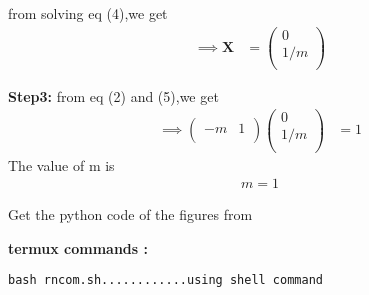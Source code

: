 \documentclass[10pt, a4paper]{article}
\let\vec\mathbf
\begin{document}
from solving eq (4),we get
\begin{align}
\implies\vec{X} &= \begin{pmatrix}0 \\ 1/m \\ \end{pmatrix}
\end{align}

\textbf{Step3:}
from eq (2) and (5),we get
\begin{align}
\implies\begin{pmatrix}-m & 1 \\ \end{pmatrix}\begin{pmatrix}0 \\ 1/m \\ \end{pmatrix} &= 1
\end{align}
The value of m is
\begin{align}
	\boxed{m=1}
\end{align}	

Get the python code of the figures from
\begin{table}[h]
\large
\centering
{}

\end{table}

\textbf{termux commands :}
\begin{lstlisting}
bash rncom.sh............using shell command
\end{lstlisting}
\end{document}
